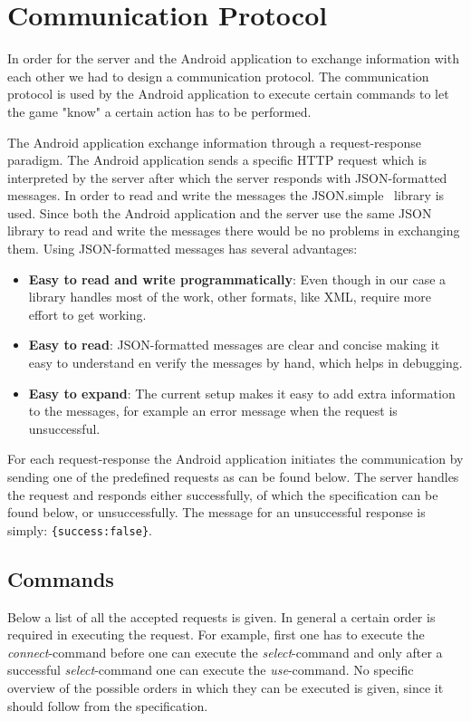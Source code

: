 \documentclass[a4paper,10pt]{report}
\begin{document}
\section{Communication Protocol}
\label{sec:communication-protocol}
In order for the server and the Android application to exchange information with each other we had to design a communication protocol.
The communication protocol is used by the Android application to execute certain commands to let the game "know" a certain action has to be performed.

The Android application exchange information through a request-response paradigm.
The Android application sends a specific HTTP request which is interpreted by the server after which the server responds with JSON-formatted messages.
In order to read and write the messages the JSON.simple~\cite{JSONsimple} library is used.
Since both the Android application and the server use the same JSON library to read and write the messages there would be no problems in exchanging them.
Using JSON-formatted messages has several advantages:
\begin{itemize}
	\item
		\textbf{Easy to read and write programmatically}:
		Even though in our case a library handles most of the work, other formats, like XML, require more effort to get working.
	\item
		\textbf{Easy to read}:
		JSON-formatted messages are clear and concise making it easy to understand en verify the messages by hand, which helps in debugging.
	\item
		\textbf{Easy to expand}:
		The current setup makes it easy to add extra information to the messages, for example an error message when the request is unsuccessful.
\end{itemize}

For each request-response the Android application initiates the communication by sending one of the predefined requests as can be found below.
The server handles the request and responds either successfully, of which the specification can be found below, or unsuccessfully.
The message for an unsuccessful response is simply: \texttt{\{success:false\}}.

	\subsection{Commands}
	Below a list of all the accepted requests is given.
	In general a certain order is required in executing the request.
	For example, first one has to execute the \emph{connect}-command before one can execute the \emph{select}-command and only after a successful \emph{select}-command one can execute the \emph{use}-command.
	No specific overview of the possible orders in which they can be executed is given, since it should follow from the specification.
		
\end{document}
